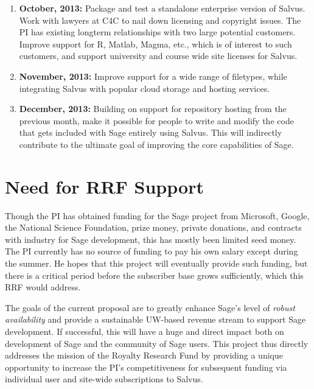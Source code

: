 \documentclass[11pt]{article}
\begin{document}
\begin{enumerate}
\item {\bf October, 2013:} Package and test a standalone enterprise
  version of Salvus.  Work with lawyers at C4C to nail down licensing
  and copyright issues. The PI has existing longterm relationships
  with two large potential customers.  Improve support
  for R, Matlab, Magma, etc., which is of interest to such customers,
  and support university and course wide site licenses for Salvus.

\item {\bf November, 2013:} Improve support for a wide range of
  filetypes, while integrating Salvus with popular cloud storage and
  hosting services.
\item {\bf December, 2013:} Building on support for repository hosting
  from the previous month, make it possible for people to write and
  modify the code that gets included with Sage entirely using Salvus.
  This will indirectly contribute to the ultimate goal of improving
  the core capabilities of Sage.
\end{enumerate}


\section{Need for RRF Support}

Though the PI has obtained funding for the Sage project from
Microsoft, Google, the National Science Foundation, prize money,
private donations, and contracts with industry for Sage development,
this has mostly been limited seed money.  
The PI currently has no source of funding to pay his own salary except
during the summer.  He hopes that this project will eventually provide
such funding, but there is a critical period before the subscriber
base grows sufficiently, which this RRF would address.


The goals of the current proposal are to greatly enhance Sage's level
of {\em robust availability} and provide a sustainable UW-based
revenue stream to support Sage development.  If successful, this will
have a huge and direct impact both on development of Sage and the
community of Sage users.  This project thus directly addresses the
mission of the Royalty Research Fund by providing a unique opportunity
to increase the PI's competitiveness for subsequent funding via
individual user and site-wide subscriptions to Salvus.
\end{document}
